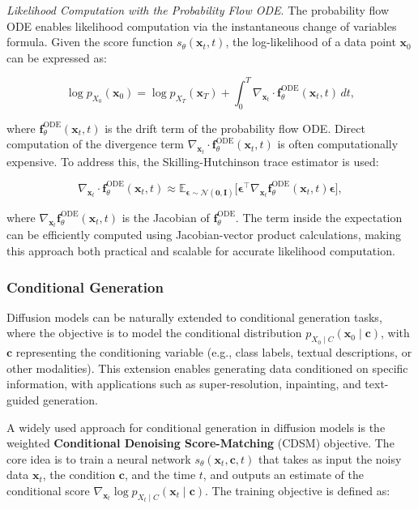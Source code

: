 \textit{Likelihood Computation with the Probability Flow ODE}. The probability flow ODE enables likelihood computation via the instantaneous change of variables formula. Given the score function \( s_\theta(\mathbf{x}_t, t) \), the log-likelihood of a data point \( \mathbf{x}_0 \) can be expressed as:

\[
\log p_{X_0}(\mathbf{x}_0) = \log p_{X_T}(\mathbf{x}_T) + \int_0^T \nabla_{\mathbf{x}_t} \cdot \mathbf{f}_\theta^{\text{ODE}}(\mathbf{x}_t, t) \, dt,
\]

\noindent where \( \mathbf{f}_\theta^{\text{ODE}}(\mathbf{x}_t, t) \) is the drift term of the probability flow ODE. Direct computation of the divergence term \( \nabla_{\mathbf{x}_t} \cdot \mathbf{f}_\theta^{\text{ODE}}(\mathbf{x}_t, t) \) is often computationally expensive. To address this, the Skilling-Hutchinson trace estimator is used:

\[
\nabla_{\mathbf{x}_t} \cdot \mathbf{f}_\theta^{\text{ODE}}(\mathbf{x}_t, t) \approx \mathbb{E}_{\mathbf{\epsilon} \sim \mathcal{N}(\mathbf{0}, \mathbf{I})} \big[ \mathbf{\epsilon}^\top \nabla_{\mathbf{x}_t} \mathbf{f}_\theta^{\text{ODE}}(\mathbf{x}_t, t) \mathbf{\epsilon} \big],
\]

\noindent where \( \nabla_{\mathbf{x}_t} \mathbf{f}_\theta^{\text{ODE}}(\mathbf{x}_t, t) \) is the Jacobian of \( \mathbf{f}_\theta^{\text{ODE}} \). The term inside the expectation can be efficiently computed using Jacobian-vector product calculations, making this approach both practical and scalable for accurate likelihood computation.


\subsubsection{Conditional Generation}

Diffusion models can be naturally extended to conditional generation tasks, where the objective is to model the conditional distribution \( p_{X_0 \mid C}(\mathbf{x}_0 \mid \mathbf{c}) \), with \( \mathbf{c} \) representing the conditioning variable (e.g., class labels, textual descriptions, or other modalities). This extension enables generating data conditioned on specific information, with applications such as super-resolution, inpainting, and text-guided generation.

A widely used approach for conditional generation in diffusion models is the weighted \textbf{Conditional Denoising Score-Matching} (CDSM) objective. The core idea is to train a neural network \( s_\theta(\mathbf{x}_t, \mathbf{c}, t) \) that takes as input the noisy data \( \mathbf{x}_t \), the condition \( \mathbf{c} \), and the time \( t \), and outputs an estimate of the conditional score \( \nabla_{\mathbf{x}_t} \log p_{X_t \mid C}(\mathbf{x}_t \mid \mathbf{c}) \). The training objective is defined as:


